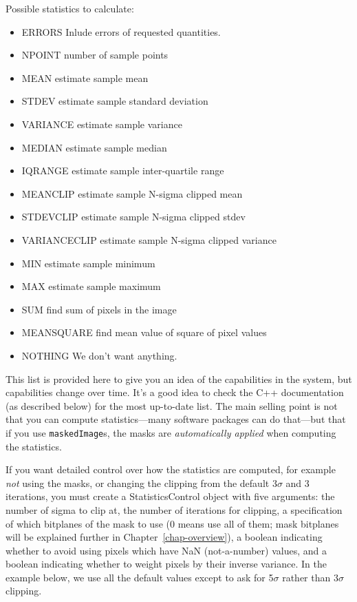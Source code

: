 \documentclass{book}
\begin{document}
Possible statistics to calculate:
\begin{itemize}
\item ERRORS     Inlude errors of requested quantities.
\item NPOINT     number of sample points
\item MEAN     estimate sample mean
\item STDEV     estimate sample standard deviation
\item VARIANCE     estimate sample variance
\item MEDIAN     estimate sample median
\item IQRANGE     estimate sample inter-quartile range
\item MEANCLIP     estimate sample N-sigma clipped mean
\item STDEVCLIP     estimate sample N-sigma clipped stdev
\item VARIANCECLIP     estimate sample N-sigma clipped variance
\item MIN     estimate sample minimum
\item MAX     estimate sample maximum
\item SUM     find sum of pixels in the image
\item MEANSQUARE     find mean value of square of pixel values
\item NOTHING     We don't want anything.
\end{itemize}

This list is provided here to give you an idea of the capabilities in
the system, but capabilities change over time.  It's a good idea to
check the C++ documentation (as described below) for the most
up-to-date list.  The main selling point is not that you can compute
statistics---many software packages can do that---but that if you use
\texttt{maskedImage}s, the masks are {\it automatically applied} when
computing the statistics.

If you want detailed control over how the statistics are computed, for
example {\it not} using the masks, or changing the clipping from the
default 3$\sigma$ and 3 iterations, you must create a
StatisticsControl object with five arguments: the number of sigma to
clip at, the number of iterations for clipping, a specification of
which bitplanes of the mask to use (0 means use all of them; mask
bitplanes will be explained further in Chapter~\ref{chap-overview}), a
boolean indicating whether to avoid using pixels which have NaN
(not-a-number) values, and a boolean indicating whether to weight
pixels by their inverse variance.  In the example below, we use all
the default values except to ask for 5$\sigma$ rather than 3$\sigma$
clipping.
\end{document}
